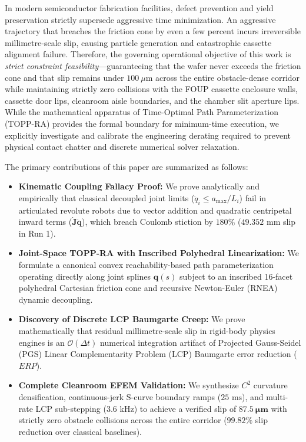 \documentclass{article}
\begin{document}
In modern semiconductor fabrication facilities, defect prevention and yield preservation strictly supersede aggressive time minimization. An aggressive trajectory that breaches the friction cone by even a few percent incurs irreversible millimetre-scale slip, causing particle generation and catastrophic cassette alignment failure. Therefore, the governing operational objective of this work is \textit{strict constraint feasibility}---guaranteeing that the wafer never exceeds the friction cone and that slip remains under $100\ \mu\text{m}$ across the entire obstacle-dense corridor while maintaining strictly zero collisions with the FOUP cassette enclosure walls, cassette door lips, cleanroom aisle boundaries, and the chamber slit aperture lips. While the mathematical apparatus of Time-Optimal Path Parameterization (TOPP-RA) provides the formal boundary for minimum-time execution, we explicitly investigate and calibrate the engineering derating required to prevent physical contact chatter and discrete numerical solver relaxation.

The primary contributions of this paper are summarized as follows:
\begin{itemize}
    \item \textbf{Kinematic Coupling Fallacy Proof:} We prove analytically and empirically that classical decoupled joint limits ($\ddot{q}_i \le a_{\max}/L_i$) fail in articulated revolute robots due to vector addition and quadratic centripetal inward terms ($\dot{\mathbf{J}}\dot{\mathbf{q}}$), which breach Coulomb stiction by $180\%$ ($49.352\text{ mm}$ slip in Run 1).
    \item \textbf{Joint-Space TOPP-RA with Inscribed Polyhedral Linearization:} We formulate a canonical convex reachability-based path parameterization operating directly along joint splines $\mathbf{q}(s)$ subject to an inscribed 16-facet polyhedral Cartesian friction cone and recursive Newton-Euler (RNEA) dynamic decoupling.
    \item \textbf{Discovery of Discrete LCP Baumgarte Creep:} We prove mathematically that residual millimetre-scale slip in rigid-body physics engines is an $\mathcal{O}(\Delta t)$ numerical integration artifact of Projected Gauss-Seidel (PGS) Linear Complementarity Problem (LCP) Baumgarte error reduction ($ERP$).
    \item \textbf{Complete Cleanroom EFEM Validation:} We synthesize $C^2$ curvature densification, continuous-jerk S-curve boundary ramps ($25\text{ ms}$), and multi-rate LCP sub-stepping ($3.6\text{ kHz}$) to achieve a verified slip of $\mathbf{87.5\ \mu\mathbf{m}}$ with strictly zero obstacle collisions across the entire corridor ($99.82\%$ slip reduction over classical baselines).
\end{itemize}
\end{document}
